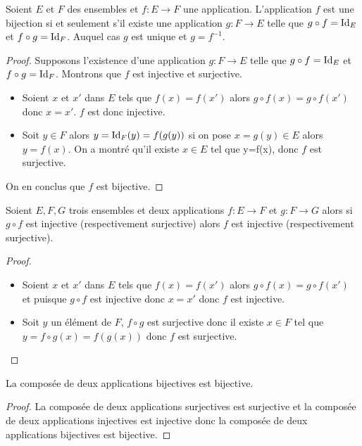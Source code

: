 \begin{theo}
Soient \(E\) et \(F\) des ensembles et \(f:E \longrightarrow F\) une application. L'application \(f\) est une bijection si et seulement s'il existe une application \(g:F \longrightarrow E\) telle que \(g \circ f = \operatorname{Id}_E\) et \(f \circ g = \operatorname{Id}_F\). Auquel cas \(g\) est unique et \(g=f^{-1}\).
\end{theo}
\begin{proof}
  Supposons l'existence d'une application \(g:F \longrightarrow E\) telle que \(g \circ f = \operatorname{Id}_E\) et \(f \circ g = \operatorname{Id}_F\). Montrons que \(f\) est injective et surjective.
  \begin{itemize}
  \item Soient \(x\) et \(x'\) dans \(E\) tels que \(f(x)=f(x')\) alors \(g \circ f(x) = g \circ f(x')\) donc \(x=x'\). \(f\) est donc injective.
  \item Soit \(y \in F\) alors \(y=\operatorname{Id}_F(y)=f(g(y))\) si on pose \(x=g(y) \in E\) alors \(y=f(x)\). On a montré qu'il existe \(x \in E\) tel que y=f(x), donc \(f\) est surjective.
  \end{itemize}
  On en conclus que \(f\) est bijective.
\end{proof}
%
\begin{prop}
  Soient \(E,F,G\) trois ensembles et deux applications \(f:E \longrightarrow F\) et \(g:F \longrightarrow G\) alors si \(g \circ f\) est injective (respectivement surjective) alors \(f\) est injective (respectivement surjective).
\end{prop}
\begin{proof}
  \begin{itemize}
  \item Soient \(x\) et \(x'\) dans \(E\) tels que \(f(x)=f(x')\) alors \(g \circ f(x) = g \circ f(x')\) et puisque \(g \circ f\) est injective donc \(x=x'\) donc \(f\) est injective.
  \item Soit \(y\) un élément de \(F\), \(f \circ g\) est surjective donc il existe \(x \in F\) tel que \(y=f \circ g(x)=f(g(x))\) donc \(f\) est surjective.
  \end{itemize}
\end{proof}
%
\begin{prop}
La composée de deux applications bijectives est bijective.
\end{prop}
\begin{proof}
La composée de deux applications surjectives est surjective et la composée de deux applications injectives est injective donc la composée de deux applications bijectives est bijective.
\end{proof}
